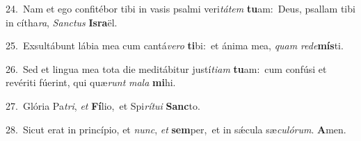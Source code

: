 {\numbfont\textcolor{\numbcolor}{24.}}~Nam et ego confitébor tibi in vasis psalmi veri\-\textit{tá}\-\textit{tem} \textbf{tu}\-am:~\star Deus, psallam tibi in cítha\-\textit{ra}\-, \textit{Sanc}\-\textit{tus} \textbf{Is}\-\textbf{ra}ël.\par
{\numbfont\textcolor{\numbcolor}{25.}}~Exsultábunt lábia mea cum cantá\-\textit{ve}\-\textit{ro} \textbf{ti}\-bi:~\star et ánima mea, \textit{quam} \textit{red}\-\textit{e}\textbf{mís}ti.\par
{\numbfont\textcolor{\numbcolor}{26.}}~Sed et lingua mea tota die meditábitur justí\-\textit{ti}\-\textit{am} \textbf{tu}\-am:~\star cum confúsi et revériti fúerint, qui quæ\textit{runt} \textit{ma}\-\textit{la} \textbf{mi}\-hi.\par
{\numbfont\textcolor{\numbcolor}{27.}}~Glória Pa\-\textit{tri}\-, \textit{et} \textbf{Fí}\-lio,~\star et Spi\-\textit{rí}\-\textit{tu}\textit{i} \textbf{Sanc}\-to.\par
{\numbfont\textcolor{\numbcolor}{28.}}~Sicut erat in princípio, et \textit{nunc}\-, \textit{et} \textbf{sem}\-per,~\star et in sǽcula sæ\-\textit{cu}\-\textit{ló}\textit{rum}. \textbf{A}\-men.\par
